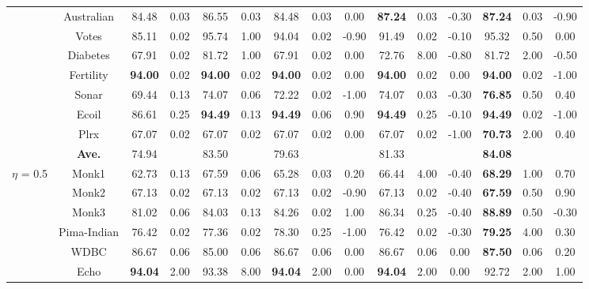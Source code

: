 \documentclass[journal,12pn, onecolumn]{IEEEtran}
\begin{document}
{{{\begin{table}
{{\begin{tabular}{ccccccccccccccc}
          & Australian & 84.48  & 0.03  & 86.55  & 0.03  & 84.48  & 0.03  & 0.00  & \textbf{87.24 } & 0.03  & -0.30  & \textbf{87.24 } & 0.03  & -0.90  \\
          & Votes & 85.11  & 0.02  & 95.74  & 1.00  & 94.04  & 0.02  & -0.90  & 91.49  & 0.02  & -0.10  & 95.32  & 0.50  & 0.00  \\
          & Diabetes & 67.91  & 0.02  & 81.72  & 1.00  & 67.91  & 0.02  & 0.00  & 72.76  & 8.00  & -0.80  & 81.72  & 2.00  & -0.50  \\
          & Fertility & \textbf{94.00 } & 0.02  & \textbf{94.00 } & 0.02  & \textbf{94.00 } & 0.02  & 0.00  & \textbf{94.00 } & 0.02  & 0.00  & \textbf{94.00 } & 0.02  & -1.00  \\
          & Sonar & 69.44  & 0.13  & 74.07  & 0.06  & 72.22  & 0.02  & -1.00  & 74.07  & 0.03  & -0.30  & \textbf{76.85 } & 0.50  & 0.40  \\
          & Ecoil & 86.61  & 0.25  & \textbf{94.49 } & 0.13  & \textbf{94.49 } & 0.06  & 0.90  & \textbf{94.49 } & 0.25  & -0.10  & \textbf{94.49 } & 0.02  & -1.00  \\
          & Plrx  & 67.07  & 0.02  & 67.07  & 0.02  & 67.07  & 0.02  & 0.00  & 67.07  & 0.02  & -1.00  & \textbf{70.73 } & 2.00  & 0.40  \\
\cmidrule{2-15}          & \textbf{Ave. } & 74.94  &       & 83.50  &       & 79.63  &       &       & 81.33  &       &       & \textbf{84.08 } &       &  \\
    \midrule
    \multirow{18}[4]{*}{$\eta$ = 0.5} & Monk1 & 62.73  & 0.13  & 67.59  & 0.06  & 65.28  & 0.03  & 0.20  & 66.44  & 4.00  & -0.40  & \textbf{68.29 } & 1.00  & 0.70  \\
          & Monk2 & 67.13  & 0.02  & 67.13  & 0.02  & 67.13  & 0.02  & -0.90  & 67.13  & 0.02  & -0.40  & \textbf{67.59 } & 0.50  & 0.90  \\
          & Monk3 & 81.02  & 0.06  & 84.03  & 0.13  & 84.26  & 0.02  & 1.00  & 86.34  & 0.25  & -0.40  & \textbf{88.89 } & 0.50  & -0.30  \\
          & Pima-Indian & 76.42  & 0.02  & 77.36  & 0.02  & 78.30  & 0.25  & -1.00  & 76.42  & 0.02  & -0.30  & \textbf{79.25 } & 4.00  & 0.30  \\
          & WDBC  & 86.67  & 0.06  & 85.00  & 0.06  & 86.67  & 0.06  & 0.00  & 86.67  & 0.06  & 0.00  & \textbf{87.50 } & 0.06  & 0.20  \\
          & Echo  & \textbf{94.04 } & 2.00  & 93.38  & 8.00  & \textbf{94.04 } & 2.00  & 0.00  & \textbf{94.04 } & 2.00  & 0.00  & 92.72  & 2.00  & 1.00  \\

\end{tabular}}}
\end{table}}}}
\end{document}
